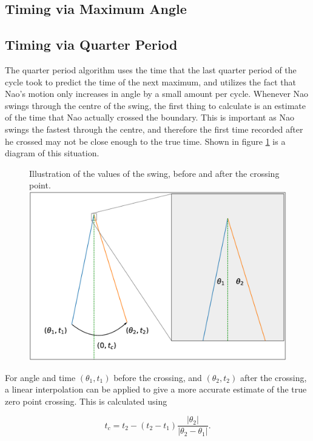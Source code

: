 \documentclass[11pt]{article}
\newcommand*\ruleline[1]{\par\noindent\raisebox{.8ex}{\makebox[\linewidth]{\hrulefill\hspace{1ex}\raisebox{-.8ex}{#1}\hspace{1ex}\hrulefill}}}
\begin{document}
\subsection{Timing via Maximum Angle}
\subsection{Timing via Quarter Period}
\ruleline{George Sheppard}
The quarter period algorithm uses the time that the last quarter period of the cycle took to predict the time of the next maximum, and utilizes the fact that Nao's motion only increases in angle by a small amount per cycle. Whenever Nao swings through the centre of the swing, the first thing to calculate is an estimate of the time that Nao actually crossed the boundary. This is important as Nao swings the fastest through the centre, and therefore the first time recorded after he crossed may not be close enough to the true time. Shown in figure \ref{fig:InterpolationDiagram} is a diagram of this situation. 

    \begin{figure}[!htb]
        \centering
        \captionbox
             {Illustration of the values of the swing, before and after the crossing point.\label{fig:InterpolationDiagram}}
             {\includegraphics[width=1.0\textwidth]{InterpolationDiagram.eps}}
    \end{figure}

For angle and time $(\theta_1, t_1)$ before the crossing, and $(\theta_2, t_2)$ after the crossing, a linear interpolation can be applied to give a more accurate estimate of the true zero point crossing. This is calculated using

\begin{equation}
    t_c = t_2 - (t_2 - t_1) \frac{|\theta_2|}{|\theta_2 - \theta_1|}.
\end{equation}
\end{document}

